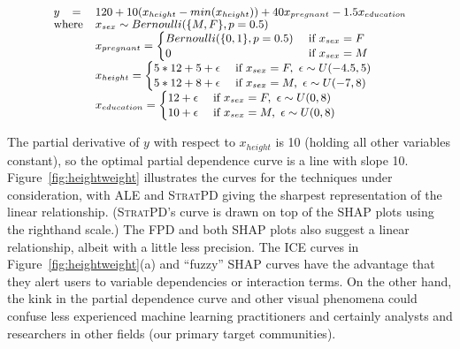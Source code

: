 \documentclass{article}
\newcommand{\figref}[1]{Figure~\ref{#1}}
\newcommand{\spd}{\fontfamily{cmr}\textsc{\small StratPD}}
\begin{document}
\begin{equation}\label{eq:weight}
{\small
\begin{array}{rll}
y & = &120 + 10(x_{height} - min(x_{height})) + 40x_{pregnant} - 1.5x_{education}\\
\vspace{-10pt}\\
\multicolumn{2}{r}{\text{where}} & x_{sex} \sim Bernoulli(\{M,F\}, p=0.5)\\
                    & & x_{pregnant} = \begin{cases}
                                               Bernoulli(\{0,1\},p=0.5) & \text{ if } x_{sex} = F\\
                                               0 & \text{ if } x_{sex}=M\\
                                               \end{cases}\\
                    & & x_{height} = \begin{cases}
                                               5*12+5+ \epsilon & \text{ if } x_{sex}=F,~ \epsilon \sim U(-4.5,5)\\	
                                               5*12+8 + \epsilon & \text{ if } x_{sex}=M,~ \epsilon \sim U(-7,8)\\
                                               \end{cases}\\
                    & & x_{education} = \begin{cases}
                                               12 + \epsilon & \text{ if } x_{sex}=F,~ \epsilon \sim U(0,8)\\	
                                               10 + \epsilon & \text{ if } x_{sex}=M,~ \epsilon \sim U(0,8)\\
                                               \end{cases}
\end{array}
}
\end{equation}

\noindent The partial derivative of $y$ with respect to $x_{height}$ is 10 (holding all other variables constant), so the optimal partial dependence curve is a line with slope 10. \figref{fig:heightweight} illustrates the curves for the techniques under consideration, with ALE and \spd{} giving the sharpest representation of the linear relationship. (\spd's curve is drawn on top of the SHAP plots using the righthand scale.) The FPD and both SHAP plots also suggest a linear relationship, albeit with a little less precision. The ICE curves in \figref{fig:heightweight}(a) and ``fuzzy'' SHAP curves have the advantage that they alert users to variable  dependencies or interaction terms.  On the other hand, the kink in the partial dependence curve and other visual phenomena could confuse less experienced machine learning practitioners and certainly analysts and researchers in other fields (our primary target communities).
\end{document}
